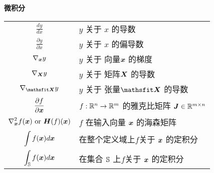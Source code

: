 \vspace{\notationgap}
\begin{minipage}{\textwidth}
\centerline{\bf 微积分}
\bgroup
\def\arraystretch{1.5}
\begin{tabular}{cp{3.25in}}
$\displaystyle\frac{d y} {d x}$ & $y$ 关于 $x$ 的导数\\ [2ex]
$\displaystyle \frac{\partial y} {\partial x} $ & $y$ 关于 $x$ 的偏导数\\
$\displaystyle \nabla_{\bm{x}} y $ & $y$ 关于 向量${\bm{x}}$ 的梯度\\
$\displaystyle \nabla_{\bm{X}} y $ & $y$ 关于 矩阵${\bm{X}}$ 的导数\\
$\displaystyle \nabla_\tX y $ & $y$ 关于 张量$\tX$ 的导数\\
$\displaystyle \frac{\partial f}{\partial {\bm{x}}} $ & $f: \mathbb{R}^n \rightarrow \mathbb{R}^m$ 的雅克比矩阵 ${\bm{J}} \in \mathbb{R}^{m\times n}$\\
$\displaystyle \nabla_{\bm{x}}^2 f({\bm{x}})\text{ or }{\bm{H}}( f)({\bm{x}})$ & $f$ 在输入向量 ${\bm{x}}$ 的海森矩阵\\
$\displaystyle \int f({\bm{x}}) d{\bm{x}} $ & 在整个定义域上$f$关于 ${\bm{x}}$ 的定积分\\
$\displaystyle \int_{\mathbb{S}} f({\bm{x}}) d{\bm{x}}$ & 在集合 ${\mathbb{S}}$ 上$f$关于 ${\bm{x}}$ 的定积分\\
\end{tabular}
\egroup
{}
\end{minipage}


